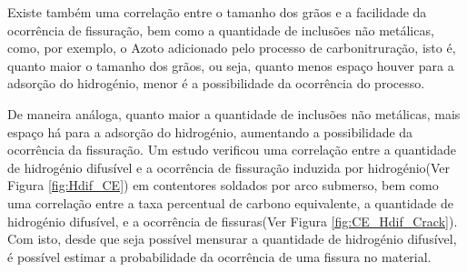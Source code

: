 \par
Existe também uma correlação entre o tamanho dos grãos e a facilidade da ocorrência de fissuração\cite{Seo2008}, bem como a quantidade de inclusões não metálicas, como, por exemplo, o Azoto adicionado pelo processo de carbonitruração, isto é, quanto maior o tamanho dos grãos, ou seja, quanto menos espaço houver para a adsorção do hidrogénio, menor é a possibilidade da ocorrência do processo.
\par
De maneira análoga, quanto maior a quantidade de inclusões não metálicas, mais espaço há para a adsorção do hidrogénio, aumentando a possibilidade da ocorrência da fissuração. Um estudo verificou uma correlação entre a quantidade de hidrogénio difusível e a ocorrência de fissuração induzida por hidrogénio\cite{Santos2021}(Ver Figura \ref{fig:Hdif_CE}) em contentores soldados por arco submerso, bem como uma correlação entre a taxa percentual de carbono equivalente, a quantidade de hidrogénio difusível, e a ocorrência de fissuras(Ver Figura \ref{fig:CE_Hdif_Crack}). Com isto, desde que seja possível mensurar a quantidade de hidrogénio difusível, é possível estimar a probabilidade da ocorrência de uma fissura no material.
